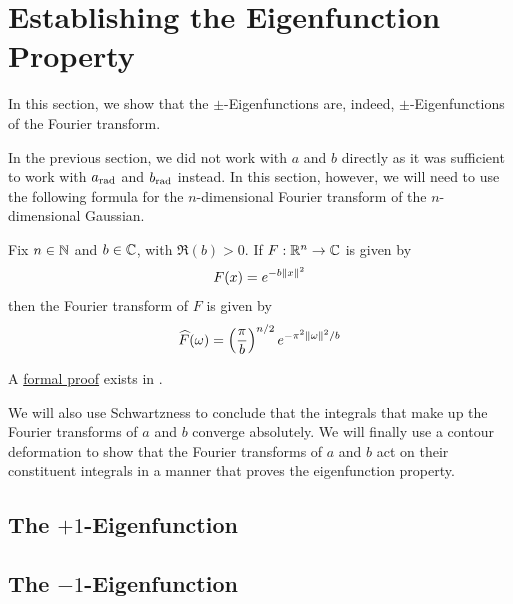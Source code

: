 \section{Establishing the Eigenfunction Property}


In this section, we show that the $\pm$-Eigenfunctions are, indeed, $\pm$-Eigenfunctions of the Fourier transform.

In the previous section, we did not work with $a$ and $b$ directly as it was sufficient to work with $a_{\operatorname{rad}}$ and $b_{\operatorname{rad}}$ instead. In this section, however, we will need to use the following formula for the $n$-dimensional Fourier transform of the $n$-dimensional Gaussian.

\begin{boxtheorem}\label{Ch4:Thm:GaussianFourier}
    Fix $n \in \mathbb{N}$ and $b \in \mathbb{C}$, with $\Re(b) > 0$. If $F : \mathbb{R}^n \to \mathbb{C}$ is given by
    \begin{align*}
        F(x) = e^{-b \left\lVert x \right\rVert^2}
    \end{align*}
    then the Fourier transform of $F$ is given by
    \begin{align*}
        \widehat{F}\!\left( \omega \right) = \left( \frac{\pi}{b} \right)^{{n} / {2}} e^{{- \pi^2 \left\lVert \omega \right\rVert^2} / {b}}
    \end{align*}
\end{boxtheorem}
A \href{https://github.com/leanprover-community/mathlib4/blob/5a2eaa85c555c4263e15928cef249cbaad2eb2d2/Mathlib/Analysis/SpecialFunctions/Gaussian/FourierTransform.lean#L360-L363}{formal proof} exists in \mathlib.

We will also use Schwartzness to conclude that the integrals that make up the Fourier transforms of $a$ and $b$ converge absolutely. We will finally use a contour deformation to show that the Fourier transforms of $a$ and $b$ act on their constituent integrals in a manner that proves the eigenfunction property.

\subsection{The $+1$-Eigenfunction}

\subsection{The $-1$-Eigenfunction}